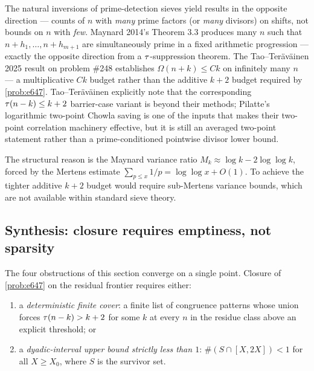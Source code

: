 \begin{remark}
\label{rem:wrong-polarity}
The natural inversions of prime-detection sieves yield results in
the opposite direction --- counts of $n$ with \emph{many} prime
factors (or \emph{many} divisors) on shifts, not bounds on $n$ with
\emph{few}. Maynard 2014's Theorem 3.3 produces many $n$ such that
$n + h_1, \ldots, n + h_{m+1}$ are simultaneously prime in a fixed
arithmetic progression --- exactly the opposite direction from a
$\tau$-suppression theorem. The Tao--Ter\"av\"ainen 2025 result on
problem \#248 \cite{TaoTeravainen2025} establishes
$\Omega(n + k) \le C k$ on infinitely many $n$ --- a multiplicative
$Ck$ budget rather than the additive $k + 2$ budget required by
\cref{prob:e647}.
Tao--Ter\"av\"ainen explicitly note that the corresponding
$\tau(n-k) \le k+2$ barrier-case variant is beyond their methods;
Pilatte's logarithmic two-point Chowla saving \cite{Pilatte2024}
is one of the inputs that makes their two-point correlation machinery
effective, but it is still an averaged two-point statement rather
than a prime-conditioned pointwise divisor lower bound.

The structural reason is the Maynard variance ratio
$M_k \approx \log k - 2 \log \log k$, forced by the Mertens estimate
$\sum_{p \le x} 1/p = \log \log x + O(1)$. To achieve the tighter
additive $k + 2$ budget would require sub-Mertens variance bounds,
which are not available within standard sieve theory.
\end{remark}

\subsection{Synthesis: closure requires emptiness, not sparsity}
\label{sec:synthesis-no-closure}

The four obstructions of this section converge on a single point.
Closure of \cref{prob:e647} on the residual frontier requires
either:

\begin{enumerate}[leftmargin=*, label=(\roman*)]
\item a \emph{deterministic finite cover}: a finite list of
  congruence patterns whose union forces $\tau(n - k) > k + 2$ for
  some $k$ at every $n$ in the residue class above an explicit
  threshold; or
\item a \emph{dyadic-interval upper bound strictly less than $1$}:
  $\#(S \cap [X, 2X]) < 1$ for all $X \ge X_0$, where $S$ is the
  survivor set.
\end{enumerate}


